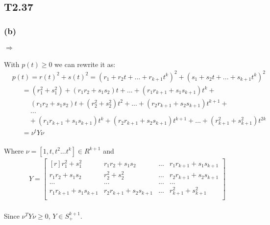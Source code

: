 \subsection*{T2.37}
\subsubsection*{(b)}
\paragraph{}
$\Rightarrow$
\paragraph{}
With $p(t) \geq 0$ we can rewrite it as:
\begin{align*}
&p(t) = r(t)^2 + s(t)^2 =
(r_1+r_2t+...+r_{k+1}t^k)^2 +(s_1+s_2t+...+s_{k+1}t^k)^2 \\
&\quad \ \ =(r_1^2 + s_1^2) +(r_1r_2+s_1s_2)t+...+(r_1r_{k+1}+s_1s_{k+1})t^k + \\
&\qquad \ \ \  (r_1r_2+s_1s_2)t+ (r_2^2 +s_2^2)t^2+...+(r_2r_{k+1}+s_2s_{k+1})t^{k+1} +\\
&\qquad \ \ \ ... \\
&\qquad \ \ + (r_1r_{k+1}+s_1s_{k+1})t^k + (r_2r_{k+1}+s_2s_{k+1})t^{k+1} +...+(r_{k+1}^2+s_{k+1}^2)t^{2k} \\
&\quad \ \ =\nu^tY\nu
\end{align*}
\paragraph{}
Where $\nu=[1, t, t^2 ... t^k] \in R^{k+1}$ and
\begin{align*}
Y=\begin{bmatrix*}[r]
r_1^2 + s_1^2        & r_1r_2+s_1s_2         & ... & r_1r_{k+1}+s_1s_{k+1} \\ 
r_1r_2+s_1s_2        & r_2^2 +s_2^2          & ... & r_2r_{k+1}+s_2s_{k+1} \\
...                  & ...                   & ... &...                    \\
r_1r_{k+1}+s_1s_{k+1}& r_2r_{k+1}+s_2s_{k+1} & ... & r_{k+1}^2+s_{k+1}^2   \\
\end{bmatrix*}
\end{align*}
\paragraph{}
Since $\nu^TY\nu \geq 0$, $Y\in S_+^{k+1}$. 

